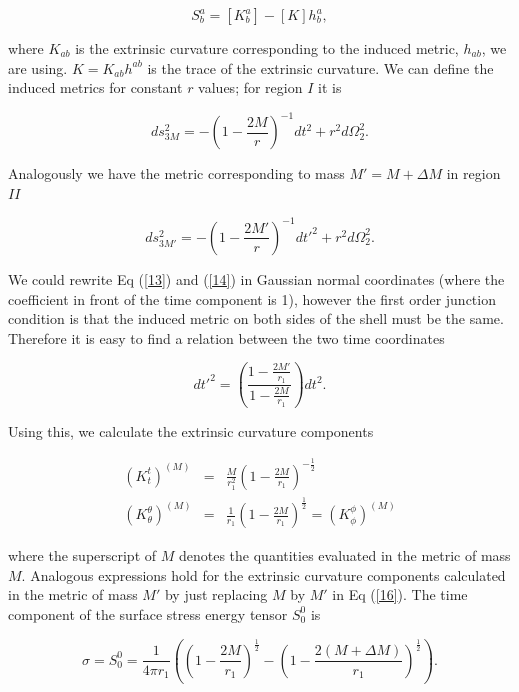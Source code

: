 \documentclass[aps,showpacs,onecolumn,floats,prd,superscriptaddress,nofootinbib]{revtex4-1}
\begin{document}
\begin{equation}
	S^a_b = [K^a_b] - [K]h^a_b,
\end{equation}

where $K_{ab}$ is the extrinsic curvature corresponding to the induced metric, $h_{ab}$, we are using. $K = K_{ab} h^{ab}$ is the trace of the extrinsic curvature.
We can define the induced metrics for constant $r$ values; for region $I$ it is 

\begin{equation}
	ds_{3M}^2 = - \left( 1 - \frac{2M}{r} \right)^{-1} dt^2 + r^2 d \Omega_2^2.	\label{13}
\end{equation}

Analogously we have the metric corresponding to mass $M' = M+ \Delta M$ in region $II$

\begin{equation}
	ds_{3M'}^2 = - \left( 1 - \frac{2M'}{r} \right)^{-1} dt'^2 + r^2 d \Omega_2^2.	\label{14}
\end{equation}

We could rewrite Eq (\ref{13}) and (\ref{14}) in Gaussian normal coordinates (where the coefficient in front of the time component is 1), however the first order junction condition is that the induced metric on both sides of the shell must be the same. Therefore it is easy to find a relation between the two time coordinates

\begin{equation}
	dt'^2 = \left( \frac{1 - \frac{2M'}{r_1}}{ 1- \frac{2M}{r_1}} \right) dt^2.
\end{equation}

Using this, we calculate the extrinsic curvature components

\begin{eqnarray}
	(K^t_t)^{(M)} & = & \frac{M}{r_1^2} \left( 1 - \frac{2M}{r_1} \right)^{-\frac{1}{2}} 	\nonumber	\\
	(K^\theta_\theta)^{(M)} & = & \frac{1}{r_1} \left( 1 - \frac{2M}{r_1} \right)^\frac{1}{2} 
	= (K^\phi_\phi)^{(M)}	\label{16}
\end{eqnarray}

where the superscript of $M$ denotes the quantities evaluated in the metric of mass $M$. Analogous expressions hold for the extrinsic curvature components calculated in the metric of mass $M'$ by just replacing $M$ by $M'$ in Eq (\ref{16}).
 The time component of the surface stress energy tensor $S^0_0$ is 

\begin{equation}
	\sigma = S^0_0 = \frac{1}{4 \pi r_1} \left( \left( 1 - \frac{2M}{r_1} \right)^\frac{1}{2} - \left( 1 - \frac{2(M+\Delta M)}{r_1} \right)^\frac{1}{2} \right).
\end{equation}
\end{document}
